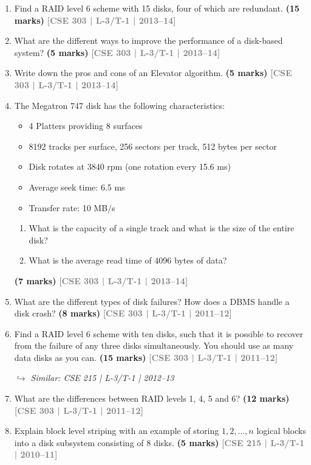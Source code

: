 \documentclass[12pt,a3paper]{article}
\newcommand{\yr}[1]{\hfill\textcolor{gray}{\small\textbf{[#1]}}}
\newcommand{\mk}[1]{\textcolor{orange!70!black}{\small\textbf{(#1 marks)}}}
\newcommand{\variant}[1]{\par\vspace{1pt}\textcolor{blue!50!black}%
  {\footnotesize\textit{$\hookrightarrow$ Similar: #1}}}
\begin{document}
\begin{enumerate}
\item Find a RAID level 6 scheme with 15 disks, four of which are redundant.
\mk{15} \yr{CSE 303 | L-3/T-1 | 2013--14}

\item What are the different ways to improve the performance of a disk-based system?
\mk{5} \yr{CSE 303 | L-3/T-1 | 2013--14}

\item Write down the pros and cons of an Elevator algorithm.
\mk{5} \yr{CSE 303 | L-3/T-1 | 2013--14}

\item The Megatron 747 disk has the following characteristics:
\begin{itemize}[leftmargin=1.5em,itemsep=1pt]
  \item 4 Platters providing 8 surfaces
  \item 8192 tracks per surface, 256 sectors per track, 512 bytes per sector
  \item Disk rotates at 3840 rpm (one rotation every 15.6 ms)
  \item Average seek time: 6.5 ms
  \item Transfer rate: 10 MB/s
\end{itemize}
\begin{enumerate}
  \item What is the capacity of a single track and what is the size of the entire disk?
  \item What is the average read time of 4096 bytes of data?
\end{enumerate}
  \mk{7} \yr{CSE 303 | L-3/T-1 | 2013--14}

\item What are the different types of disk failures? How does a DBMS handle a disk crash?
\mk{8} \yr{CSE 303 | L-3/T-1 | 2011--12}

\item Find a RAID level 6 scheme with ten disks, such that it is possible to recover from the failure of any three disks simultaneously. You should use as many data disks as you can.
\mk{15} \yr{CSE 303 | L-3/T-1 | 2011--12}

\variant{CSE 215 | L-3/T-1 | 2012--13}

\item What are the differences between RAID levels 1, 4, 5 and 6?
\mk{12} \yr{CSE 303 | L-3/T-1 | 2011--12}

\item Explain block level striping with an example of storing $1, 2, \ldots, n$ logical blocks into a disk subsystem consisting of 8 disks.
\mk{5} \yr{CSE 215 | L-3/T-1 | 2010--11}

\end{enumerate}
\end{document}
